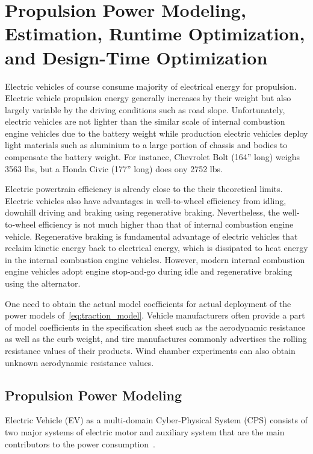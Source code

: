 
\section{Propulsion Power Modeling, Estimation, Runtime Optimization, and Design-Time Optimization} \label{sec:propulsion}

Electric vehicles of course consume majority of electrical energy for propulsion. Electric vehicle propulsion energy generally increases by their weight but also largely variable by the driving conditions such as road slope. Unfortunately, electric vehicles are not lighter than the similar scale of internal combustion engine vehicles due to the battery weight while production electric vehicles deploy light materials such as aluminium to a large portion of chassis and bodies to compensate the battery weight. For instance, Chevrolet Bolt (164” long) weighs 3563 lbs, but a Honda Civic (177” long) does ony 2752 lbs.

Electric powertrain efficiency is already close to the their theoretical limits. Electric vehicles also have advantages in well-to-wheel efficiency from idling, downhill driving and braking using regenerative braking. Nevertheless, the well-to-wheel efficiency is not much higher than that of internal combustion engine vehicle. Regenerative braking is fundamental advantage of electric vehicles that reclaim kinetic energy back to electrical energy, which is dissipated to heat energy in the internal combustion engine vehicles. However, modern internal combustion engine vehicles adopt engine stop-and-go during idle and regenerative braking using the alternator.

One need to obtain the actual model coefficients for actual deployment of the power models of~\eqref{eq:traction_model}. Vehicle manufacturers often provide a part of model coefficients in the specification sheet such as the aerodynamic resistance as well as the curb weight, and tire manufactures commonly advertises the rolling resistance values of their products. Wind chamber experiments can also obtain unknown aerodynamic resistance values.

\subsection{Propulsion Power Modeling} \label{subsec:propulsion_model}

Electric Vehicle (EV) as a multi-domain Cyber-Physical System (CPS) consists of two major systems of electric motor and auxiliary system that are the main contributors to the power consumption~\cite{AF_1,AF_2,AF_3,Park:DAC13}.

